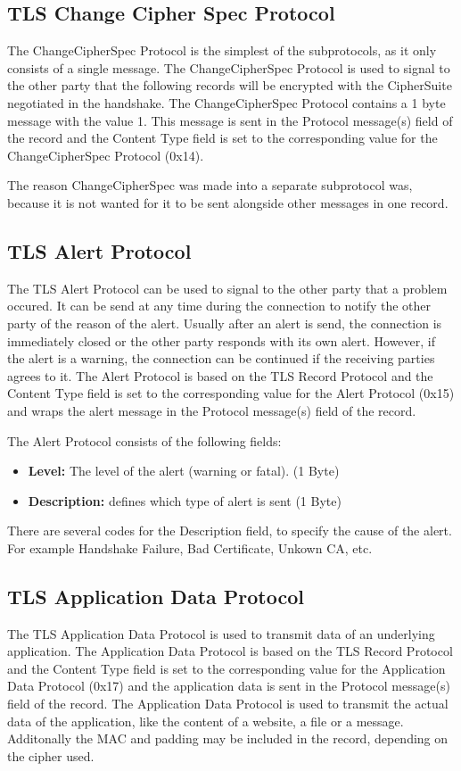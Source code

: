 \subsection{TLS Change Cipher Spec Protocol}

The ChangeCipherSpec Protocol is the simplest of the subprotocols, as it only consists of a single message. The ChangeCipherSpec Protocol is used to signal to the other party that the following records will be encrypted with the CipherSuite negotiated in the handshake. 
The ChangeCipherSpec Protocol contains a 1 byte message with the value 1. This message is sent in the Protocol message(s) field of the record and the Content Type field is set to the corresponding value for the ChangeCipherSpec Protocol (0x14).

The reason ChangeCipherSpec was made into a separate subprotocol was, because it is not wanted for it to be sent alongside other messages in one record.  

\subsection{TLS Alert Protocol}

The TLS Alert Protocol can be used to signal to the other party that a problem occured. It can be send at any time during the connection to notify the other party of the reason of the alert. Usually after an alert is send, the connection is immediately closed or the other party responds with its own alert. However, if the alert is a warning, the connection can be continued if the receiving parties agrees to it. The Alert Protocol is based on the TLS Record Protocol and the Content Type field is set to the corresponding value for the Alert Protocol (0x15) and wraps the alert message in the Protocol message(s) field of the record.

The Alert Protocol consists of the following fields:
\begin{itemize}
    \item \textbf{Level:} The level of the alert (warning or fatal). (1 Byte)
    \item \textbf{Description:} defines which type of alert is sent (1 Byte)
\end{itemize}

There are several codes for the Description field, to specify the cause of the alert. For example Handshake Failure, Bad Certificate, Unkown CA, etc.

\subsection{TLS Application Data Protocol}

The TLS Application Data Protocol is used to transmit data of an underlying application. The Application Data Protocol is based on the TLS Record Protocol and the Content Type field is set to the corresponding value for the Application Data Protocol (0x17) and the application data is sent in the Protocol message(s) field of the record. The Application Data Protocol is used to transmit the actual data of the application, like the content of a website, a file or a message.
Additonally the MAC and padding may be included in the record, depending on the cipher used.
